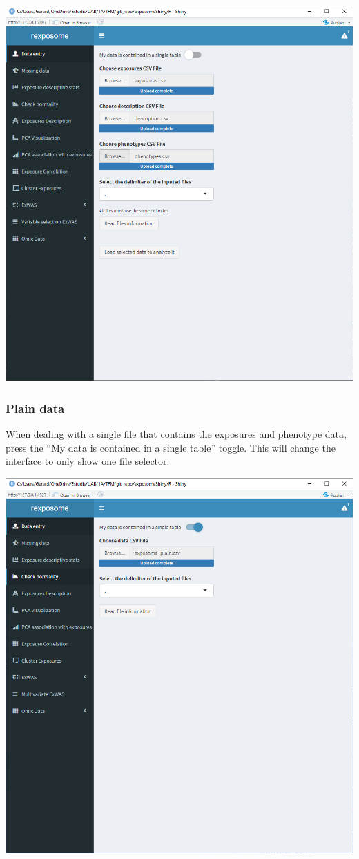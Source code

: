 \documentclass[
]{book}
\begin{document}
\includegraphics{images/analysis1_2_2_1.png}

\hypertarget{plain_data}{%
\subsubsection{Plain data}\label{plain_data}}

When dealing with a single file that contains the exposures and phenotype data, press the ``My data is contained in a single table'' toggle. This will change the interface to only show one file selector.

\includegraphics{images/plain_table_1.png}
\end{document}
